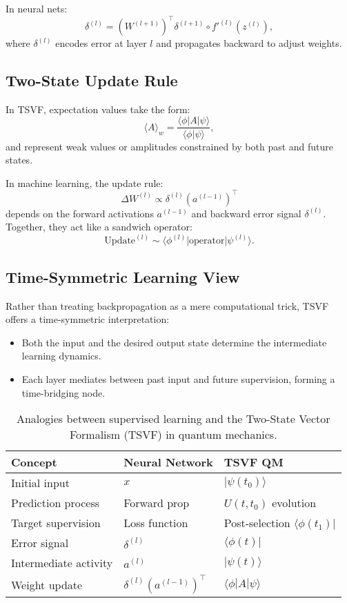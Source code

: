 \documentclass[../../../OAE-SPEC-MAIN.tex]{subfiles}
\begin{document}
In neural nets:
\[
\delta^{(l)} = (W^{(l+1)})^\top \delta^{(l+1)} \circ f'^{(l)}(z^{(l)}),
\]
where \(\delta^{(l)}\) encodes error at layer \(l\) and propagates backward to adjust weights.

\subsection{Two-State Update Rule}

In TSVF, expectation values take the form:
\[
\langle A \rangle_w = \frac{\langle \phi | A | \psi \rangle}{\langle \phi | \psi \rangle},
\]
and represent weak values or amplitudes constrained by both past and future states.

In machine learning, the update rule:
\[
\Delta W^{(l)} \propto \delta^{(l)} (a^{(l-1)})^\top
\]
depends on the forward activations \(a^{(l-1)}\) and backward error signal \(\delta^{(l)}\). Together, they act like a sandwich operator:
\[
\text{Update}^{(l)} \sim \langle \phi^{(l)} | \text{operator} | \psi^{(l)} \rangle.
\]

\subsection{Time-Symmetric Learning View}

Rather than treating backpropagation as a mere computational trick, TSVF offers a time-symmetric interpretation:

\begin{itemize}
  \item Both the input and the desired output state determine the intermediate learning dynamics.
  \item Each layer mediates between past input and future supervision, forming a time-bridging node.
\end{itemize}

\begin{table}[htbp]
  \centering
  \footnotesize
  \begin{tabular}{@{}lll@{}}
    \toprule
    \textbf{Concept} & \textbf{Neural Network} & \textbf{TSVF QM} \\
    \midrule
    Initial input        & \(x\)                       & \(|\psi(t_0)\rangle\) \\
    Prediction process   & Forward prop                & \(U(t, t_0)\) evolution \\
    Target supervision   & Loss function               & Post-selection \(\langle\phi(t_1)|\) \\
    Error signal         & \(\delta^{(l)}\)            & \(\langle\phi(t)|\) \\
    Intermediate activity& \(a^{(l)}\)                 & \(|\psi(t)\rangle\) \\
    Weight update        & \(\delta^{(l)} (a^{(l-1)})^\top\) & \(\langle \phi | A | \psi \rangle\) \\
    \bottomrule
  \end{tabular}
  \caption{Analogies between supervised learning and the Two-State Vector Formalism (TSVF) in quantum mechanics.}
  \label{tab:tsvf_analogy}
\end{table}
\end{document}
